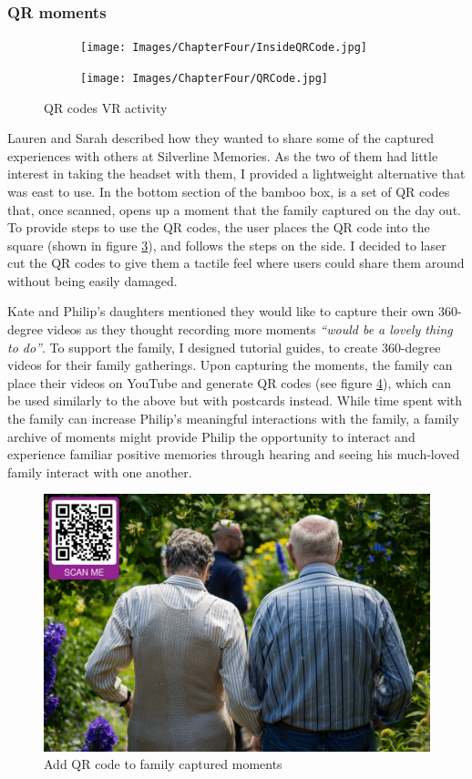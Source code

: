 \subsubsection{QR moments}
\label{QR-Code-Moments}

\begin{figure}[htp]
\centering
\begin{subfigure}{.5\textwidth}
  \centering
  \texttt{[image: Images/ChapterFour/InsideQRCode.jpg]}
  \label{fig:insideQRBox}
\end{subfigure}%
\begin{subfigure}{.5\textwidth}
  \centering
  \texttt{[image: Images/ChapterFour/QRCode.jpg]}
  \label{fig:QRCode}
\end{subfigure}
\caption{QR codes VR activity}
\label{fig:QRcodes}
\end{figure}
Lauren and Sarah described how they wanted to share some of the captured experiences with others at Silverline Memories. As the two of them had little interest in taking the headset with them, I provided a lightweight alternative that was east to use. In the bottom section of the bamboo box, is a set of QR codes that, once scanned, opens up a moment that the family captured on the day out. To provide steps to use the QR codes, the user places the QR code into the square (shown in figure \ref{fig:QRcodes}), and follows the steps on the side. I decided to laser cut the QR codes to give them a tactile feel where users could share them around without being easily damaged.

Kate and Philip's daughters mentioned they would like to capture their own 360-degree videos as they thought recording more moments \textit{``would be a lovely thing to do''}. To support the family, I designed tutorial guides, to create 360-degree videos for their family gatherings. Upon capturing the moments, the family can place their videos on YouTube and generate QR codes (see figure \ref{fig:QRCode-Captured}), which can be used similarly to the above but with postcards instead. While time spent with the family can increase Philip’s meaningful interactions with the family, a family archive of moments might provide Philip the opportunity to interact and experience familiar positive memories through hearing and seeing his much-loved family interact with one another.

\begin{figure}[htp]
\centering
\includegraphics[width=.6\linewidth]{Images/ChapterFour/QRScanPhoto.png}
\caption{Add QR code to family captured moments}
\label{fig:QRCode-Captured}
\end{figure}

